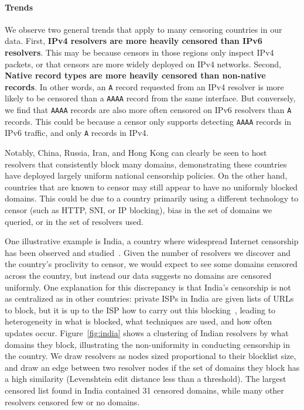 
\paragraph{Trends}
We observe two general trends that apply to many censoring countries in our data.
First, \textbf{IPv4 resolvers are more heavily censored than IPv6 resolvers}.
This may be because censors in those regions only inspect IPv4 packets, or that
censors are more widely deployed on IPv4 networks. Second, \textbf{Native record
types are more heavily censored than non-native records}. In other words, an
\texttt{A} record requested from an IPv4 resolver is more likely to be censored
than a \texttt{AAAA} record from the same interface. But conversely, we find
that \texttt{AAAA} records are also more often censored on IPv6 resolvers than
\texttt{A} records. This could be because a censor only supports detecting
\texttt{AAAA} records in IPv6 traffic, and only \texttt{A} records in IPv4.


Notably, China, Russia, Iran, and Hong Kong can clearly be seen to host
resolvers that consistently block many domains, demonstrating these countries have
deployed largely uniform national censorship policies. On the other hand,
countries that are known to censor may still appear to have no uniformly blocked
domains. This could be due to a country primarily using a different technology
to censor (such as HTTP, SNI, or IP blocking), bias in the set of domains we
queried, or in the set of resolvers used.

One illustrative example is India, a country where widespread Internet censorship has
been observed and studied~\cite{singh2020india,Yadav2018a}. Given the number
of resolvers we discover and the country's proclivity to censor, we would expect to see
some domains censored across the country, but instead our data suggests no
domains are censored uniformly. One explanation for this discrepancy is that
India's censorship is not as centralized as in other countries: private ISPs in
India are given lists of URLs to block, but it is up to the ISP how to carry out
this blocking~\cite{Gosain2017a}, leading to heterogeneity in what is blocked,
what techniques are used, and how often updates occur.  Figure~\ref{fig:india}
shows a clustering of Indian resolvers by what domains they block, illustrating the non-uniformity in
conducting censorship in the country. We draw resolvers as nodes sized proportional
to their blocklist size, and draw an edge between two resolver
nodes if the set of domains they block has a high similarity (Levenshtein edit
distance less than a threshold). The largest censored list found in India contained 31
censored domains, while many other resolvers censored few or no domains.


\FigIndiaCluster
\fi


